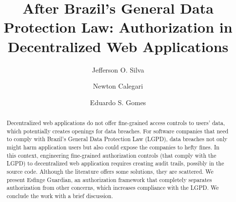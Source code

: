 \documentclass[sigconf]{acmart}
\begin{document}
%
\title[After Brazil's LGPD: Authorization in Decentralized Web Applications]{After Brazil's General Data Protection Law: Authorization in Decentralized Web Applications}

%
\author{Jefferson O. Silva}

\author{Newton Calegari}

\author{Eduardo S. Gomes}

%
\renewcommand{\shortauthors}{Silva et al.}

%
\begin{abstract}
Decentralized web applications do not offer fine-grained access controls to users' data, which potentially creates openings for data breaches. For software companies that need to comply with Brazil's  General Data Protection Law (LGPD), data breaches not only might harm application users but also could expose the companies to hefty fines. In this context, engineering fine-grained authorization controls (that comply with the LGPD) to decentralized web application requires creating audit trails, possibly in the source code. Although the literature offers some solutions, they are scattered. We present Esfinge Guardian, an authorization framework that completely separates authorization from other concerns, which increases compliance with the LGPD. We conclude the work with a brief discussion.
\end{abstract}
\end{document}
